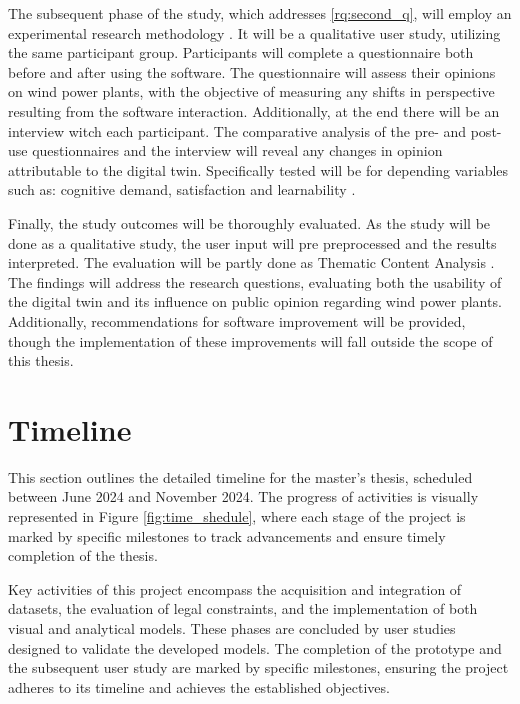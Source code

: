 \documentclass[11pt, titlepage, a4paper]{scrartcl}
\begin{document}
\begin{linenumbers}
    The subsequent phase of the study, which addresses \cref{rq:second_q}, will employ an experimental research methodology \cite{lazarResearchMethodsHuman2017}. It will be a qualitative user study, utilizing the same participant group. Participants will complete a questionnaire both before and after using the software. The questionnaire will assess their opinions on wind power plants, with the objective of measuring any shifts in perspective resulting from the software interaction. Additionally, at the end there will be an interview witch each participant. The comparative analysis of the pre- and post-use questionnaires and the interview will reveal any changes in opinion attributable to the digital twin.
    Specifically tested will be for depending variables such as: cognitive demand, satisfaction and learnability  \cite{lazarResearchMethodsHuman2017}.

    Finally, the study outcomes will be thoroughly evaluated. As the study will be done as a qualitative study, the user input will pre preprocessed and the results interpreted. The evaluation will be partly done as Thematic Content Analysis \cite{lazarResearchMethodsHuman2017}. The findings will address the research questions, evaluating both the usability of the digital twin and its influence on public opinion regarding wind power plants. Additionally, recommendations for software improvement will be provided, though the implementation of these improvements will fall outside the scope of this thesis.


    \section{Timeline}
    This section outlines the detailed timeline for the master's thesis, scheduled between June 2024 and November 2024.
    The progress of activities is visually represented in Figure \ref{fig:time_shedule}, where each stage of the project is marked by specific milestones to track advancements and ensure timely completion of the thesis.


    Key activities of this project encompass the acquisition and integration of datasets, the evaluation of legal constraints, and the implementation of both visual and analytical models. These phases are concluded by user studies designed to validate the developed models. The completion of the prototype and the subsequent user study are marked by specific milestones, ensuring the project adheres to its timeline and achieves the established objectives.


\end{linenumbers}
\end{document}
